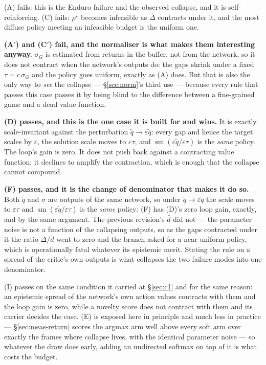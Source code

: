 \documentclass{article}
\DeclareMathOperator{\sm}{sm}
\newcommand{\gapbar}{\overline{\Delta}}
\newcommand{\dbar}{\bar{d}}
\newcommand{\srank}{\sigma}
\newcommand{\snorm}{\sigma_{G}}
\begin{document}
(A) fails: this is the Enduro failure and the observed collapse, and it is self-reinforcing.
(C) fails: $\rho^\star$ becomes infeasible as $\gapbar$ contracts under it, and the most diffuse
policy meeting an infeasible budget is the uniform one.

\textbf{(A$'$) and (C$'$) fail, and the normaliser is what makes them interesting anyway.}
$\snorm$ is estimated from returns in the buffer, not from the network, so it does not
contract when the network's outputs do: the gaps shrink under a fixed $\tau = c\,\snorm$ and
the policy goes uniform, exactly as (A) does. But that is also the only way to \emph{see} the
collapse --- \S\ref{sec:norm}'s third use --- because every rule that passes this case passes it
by being blind to the difference between a fine-grained game and a dead value function.

\textbf{(D) passes, and this is the one case it is built for and wins.} It is exactly
scale-invariant against the perturbation $\tilde{q} \to \varepsilon\tilde{q}$: every gap and
hence the target scales by $\varepsilon$, the solution scale moves to $\varepsilon\tau$, and
$\sm(\varepsilon\tilde{q}/\varepsilon\tau)$ is the \emph{same} policy. The loop's gain is zero.
It does not push back against a contracting value function; it declines to amplify the
contraction, which is enough that the collapse cannot compound.

\textbf{(F) passes, and it is the change of denominator that makes it do so.} Both $\tilde{q}$
and $\srank$ are outputs of the same network, so under $\tilde{q} \to \varepsilon\tilde{q}$ the
scale moves to $\varepsilon\tau$ and $\sm(\varepsilon\tilde{q}/\varepsilon\tau)$ is the
\emph{same} policy: (F) has (D)'s zero loop gain, exactly, and by the same argument. The previous
revision's $\dbar$ did not --- the parameter noise is not a function of the collapsing outputs,
so as the gaps contracted under it the ratio $\gapbar/\dbar$ went to zero and the branch asked
for a near-uniform policy, which is operationally fatal whatever its epistemic merit. Stating the
rule on a spread of the critic's own outputs is what collapses the two failure modes into one
denominator.

(I) passes on the same condition it carried at \S\ref{sec:c1} and for the same reason: an
epistemic spread of the network's own action values contracts with them and the loop gain is
zero, while a novelty score does not contract with them and its carrier decides the case. (E) is
exposed here in principle and much less in practice --- \S\ref{sec:meas-return} scores the
argmax arm well above every soft arm over exactly the frames where collapse lives, with the
identical parameter noise --- so
whatever the draw does early, adding an undirected softmax on top of it is what costs the budget.
\end{document}
